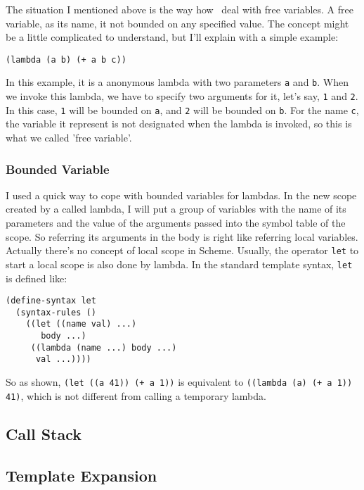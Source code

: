 The situation I mentioned above is the way how \revo\ deal with
free variables. A free variable, as its name, it not bounded on any
specified value. The concept might be a little complicated to
understand, but I'll explain with a simple example:
\begin{verbatim}
(lambda (a b) (+ a b c))
\end{verbatim}

In this example, it is a anonymous lambda with two parameters \verb+a+
and \verb+b+. When we invoke this lambda, we have to specify two
arguments for it, let's say, \verb+1+ and \verb+2+. In this case,
\verb+1+ will be bounded on \verb+a+, and \verb+2+ will be bounded on
\verb+b+. For the name \verb+c+, the variable it represent is not
designated when the lambda is invoked, so this is what we called 'free
variable'.

\subsubsection{Bounded Variable}
I used a quick way to cope with bounded variables for lambdas. In the
new scope created by a called lambda, I will put a group of variables
with the name of its parameters and the value of the arguments passed
into the symbol table of the scope. So referring its arguments in the
body is right like referring local variables. Actually there's no
concept of local scope in Scheme. Usually, the operator \verb+let+ to
start a local scope is also done by lambda. In the standard template
syntax, \verb+let+ is defined like:

\begin{verbatim}
(define-syntax let
  (syntax-rules ()
    ((let ((name val) ...)
       body ...)
     ((lambda (name ...) body ...)
      val ...))))
\end{verbatim}

So as shown, \verb^(let ((a 41)) (+ a 1))^ is equivalent to
\verb^((lambda (a) (+ a 1)) 41)^, which is not different from calling
a temporary lambda.

\subsection{Call Stack}


\subsection{Template Expansion}







